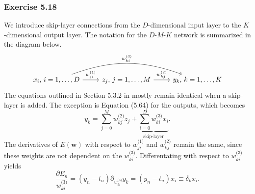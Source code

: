 \documentclass[12pt, a4paper]{article}
\newcommand{\vect}[1]{\bm{#1}}
\begin{document}
\subsubsection*{Exercise 5.18}
We introduce skip-layer connections from the $D$-dimensional input layer to the $K$-dimensional output layer.
The notation for the $D$-$M$-$K$ network is summarized in the diagram below.
\begin{equation*}
\begin{tikzcd}
x_i, \, i=1,\ldots, D \arrow{r}{w_{ji}^{\text{(1)}}}
\arrow[bend left = 20]{rr}{w_{ki}^{\text{(3)}}}
 &  
z_j , \, j=1,\ldots, M \arrow{r}{w_{kj}^{\text{(2)}}} & 
y_k , \, k=1,\ldots, K
\end{tikzcd}
\end{equation*}
The equations outlined in Section 5.3.2 in \cite{bishop_pattern_2011} mostly remain identical when a skip-layer is added.
The exception is Equation (5.64) for the outputs, which becomes
\begin{equation*}
	y_k = \sum_{j=0}^{M} w_{kj}^{\text{(2)}} z_j
	+ \underbrace{\sum_{i=0}^{D} w_{ki}^{\text{(3)}} x_i}_{\text{skip-layer}}.
\end{equation*}
The derivatives of $E(\vect{w})$ with respect to $w_{ji}^{\text{(1)}}$ and $w_{kj}^{\text{(2)}}$ remain the same, since these weights are not dependent on the $w_{ki}^{\text{(3)}}$.
Differentating with respect to $w_{ki}^{\text{(3)}}$ yields
\begin{equation*}
	\frac{\partial E_n }{w_{ki}^{\text{(3)}}}
	 = (y_n - t_n) \partial_{w_{ki}^{\text{(3)}}} y_k
	 = (y_n - t_n) x_i \equiv \delta_k x_i.
\end{equation*}
\end{document}
